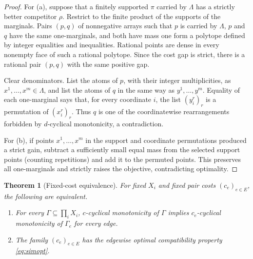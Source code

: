 \documentclass[11pt]{article}
\newtheorem{theorem}{Theorem}
\newcommand{\1}{\mathbf 1}
\begin{document}
\begin{proof}
For (a), suppose that a finitely supported $\pi$ carried by $\Lambda$ has a
strictly better competitor $\rho$.  Restrict to the finite product of the
supports of the marginals.  Pairs $(p,q)$ of nonnegative arrays such that
$p$ is carried by $\Lambda$, $p$ and $q$ have the same one-marginals, and
both have mass one form a polytope defined by integer equalities and
inequalities.  Rational points are dense in every nonempty face of such a
rational polytope.  Since the cost gap is strict, there is a rational pair
$(p,q)$ with the same positive gap.

Clear denominators.  List the atoms of $p$, with their integer
multiplicities, as $x^1,\ldots,x^m\in\Lambda$, and list the atoms of $q$ in
the same way as $y^1,\ldots,y^m$.  Equality of each one-marginal says that,
for every coordinate $i$, the list $(y_i^r)_r$ is a permutation of
$(x_i^r)_r$.  Thus $q$ is one of the coordinatewise rearrangements forbidden
by $d$-cyclical monotonicity, a contradiction.

For (b), if points $x^1,\ldots,x^m$ in the support and coordinate
permutations produced a strict gain, subtract a sufficiently small equal
mass from the selected support points (counting repetitions) and add it to
the permuted points.  This preserves all one-marginals and strictly raises
the objective, contradicting optimality.
\end{proof}

\begin{theorem}[Fixed-cost equivalence]\label{thm:compatibility}
For fixed $X_i$ and fixed pair costs $(c_e)_{e\in E}$, the following are
equivalent.
\begin{enumerate}[label=\textup{(\roman*)}]
\item For every $\Gamma\subseteq\prod_iX_i$, $c$-cyclical monotonicity of
$\Gamma$ implies $c_e$-cyclical monotonicity of $\Gamma_e$ for every edge.
\item The family $(c_e)_{e\in E}$ has the edgewise optimal compatibility
property \eqref{eq:simopt}.
\end{enumerate}
\end{theorem}
\end{document}

